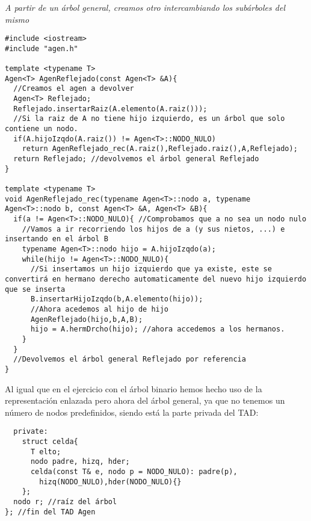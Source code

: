 \textbf{}\textit{ A partir de un árbol general, creamos otro intercambiando los subárboles del mismo}

\begin{verbatim}
#include <iostream>
#include "agen.h"

template <typename T>
Agen<T> AgenReflejado(const Agen<T> &A){
  //Creamos el agen a devolver
  Agen<T> Reflejado;
  Reflejado.insertarRaiz(A.elemento(A.raiz()));
  //Si la raiz de A no tiene hijo izquierdo, es un árbol que solo contiene un nodo.
  if(A.hijoIzqdo(A.raiz()) != Agen<T>::NODO_NULO)
    return AgenReflejado_rec(A.raiz(),Reflejado.raiz(),A,Reflejado);
  return Reflejado; //devolvemos el árbol general Reflejado
}

template <typename T>
void AgenReflejado_rec(typename Agen<T>::nodo a, typename Agen<T>::nodo b, const Agen<T> &A, Agen<T> &B){
  if(a != Agen<T>::NODO_NULO){ //Comprobamos que a no sea un nodo nulo
    //Vamos a ir recorriendo los hijos de a (y sus nietos, ...) e insertando en el árbol B
    typename Agen<T>::nodo hijo = A.hijoIzqdo(a);
    while(hijo != Agen<T>::NODO_NULO){
      //Si insertamos un hijo izquierdo que ya existe, este se convertirá en hermano derecho automaticamente del nuevo hijo izquierdo que se inserta
      B.insertarHijoIzqdo(b,A.elemento(hijo));
      //Ahora acedemos al hijo de hijo
      AgenReflejado(hijo,b,A,B);
      hijo = A.hermDrcho(hijo); //ahora accedemos a los hermanos.
    }
  }
  //Devolvemos el árbol general Reflejado por referencia
}
\end{verbatim}
\newpage
Al igual que en el ejercicio con el  árbol binario hemos hecho uso de la representación enlazada pero ahora del árbol general, ya que no tenemos un número de nodos predefinidos, siendo está la parte privada del TAD:
\begin{verbatim}
  private:
    struct celda{
      T elto;
      nodo padre, hizq, hder;
      celda(const T& e, nodo p = NODO_NULO): padre(p),
        hizq(NODO_NULO),hder(NODO_NULO){}
    };
  nodo r; //raíz del árbol
}; //fin del TAD Agen
\end{verbatim}

